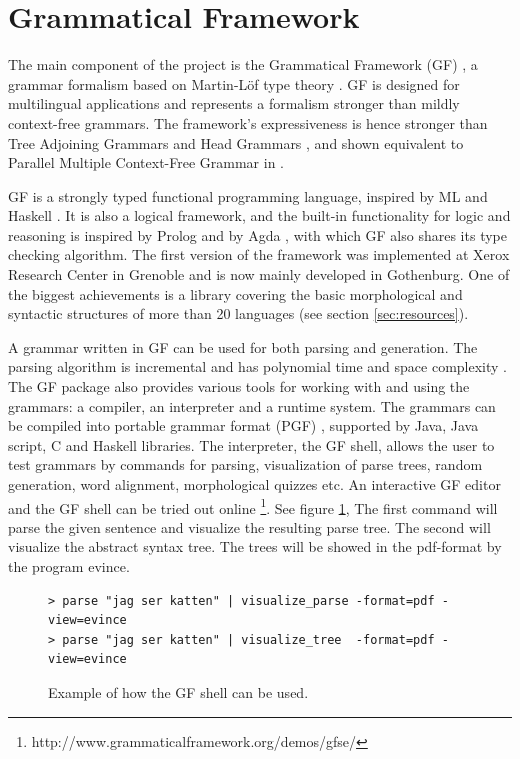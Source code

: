 \documentclass{report}
\begin{document}
\section{Grammatical Framework}
\label{sec:gf}
The main component of the project is the Grammatical Framework (GF) \cite{gfbok}, %
a grammar formalism based on Martin-Löf type theory \cite{martinlof}. GF is
designed for multilingual applications and represents a formalism
stronger than mildly context-free grammars. 
The framework's %
expressiveness is hence stronger than 
Tree Adjoining Grammars \cite{tag} and Head Grammars \cite{hg}, and shown
equivalent to Parallel Multiple Context-Free Grammar \cite{pmcfg} in \cite{peter}.

GF is a strongly typed functional programming language, inspired by
ML \cite{ml} and Haskell \cite{haskell}. It is also a logical framework,
and the built-in functionality for logic and reasoning 
is inspired by \textlambda Prolog \cite{prolog} and 
by Agda \cite{agda}, with which GF also shares its type checking algorithm.
The first version of the framework was implemented at Xerox Research Center
in Grenoble and is now mainly developed in Gothenburg. One of the biggest
achievements is a library covering the 
basic morphological and syntactic structures of more than
20 languages (see section \ref{sec:resources}).


A grammar written in GF can be used for both parsing and generation.
The parsing algorithm is incremental and has polynomial time and space
complexity \cite{gfMech}. 
The GF package also provides various tools for working with and using the grammars:
a compiler, an interpreter and a runtime system.
The grammars can be compiled into portable grammar format (PGF) \cite{pgf},
supported by %
Java, Java script, C and Haskell libraries. 
The interpreter, the GF shell, allows
the user to test grammars by commands for parsing, visualization of parse trees,
random generation, word alignment, morphological quizzes etc.
An interactive GF editor and the GF shell can be tried out online 
\footnote{http://www.grammaticalframework.org/demos/gfse/}. See figure \ref{fig:shell},
 The first command will parse the given
sentence and visualize the resulting parse tree. The second will visualize the 
abstract syntax tree. The trees will be showed in the pdf-format by the program evince.
\begin{figure}[h]
\begin{verbatim} 
> parse "jag ser katten" | visualize_parse -format=pdf -view=evince
> parse "jag ser katten" | visualize_tree  -format=pdf -view=evince
\end{verbatim}
\caption{Example of how the GF shell can be used.}\label{fig:shellvp}
\label{fig:shell}
\end{figure}
\end{document}
